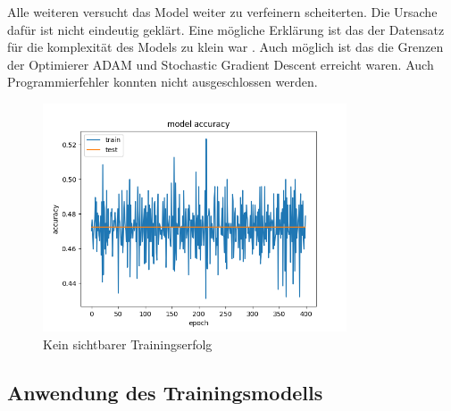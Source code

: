 \documentclass[conference]{IEEEtran}
\begin{document}
Alle weiteren versucht das Model weiter zu verfeinern scheiterten. Die Ursache dafür ist nicht eindeutig geklärt. Eine mögliche Erklärung ist  das der Datensatz für die komplexität des Models zu klein war . Auch möglich ist das die Grenzen der Optimierer ADAM und Stochastic Gradient Descent erreicht waren. Auch Programmierfehler konnten nicht ausgeschlossen werden. 

\begin{figure}[!h]
	\centering
	\includegraphics[width=9cm]{img/480x360:400@32_accuracy.png}
	\caption{Kein sichtbarer Trainingserfolg}
	\label{erfolgloos }
\end{figure}


\subsection{Anwendung des Trainingsmodells} %
\end{document}
